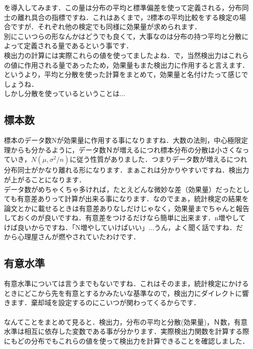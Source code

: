 \documentclass[11pt,a4paper]{ujreport} 	%
\begin{document}
を導入してみます．この量は分布の平均と標準偏差を使って定義される，分布同士の離れ具合の指標ですね．これはあくまで，2標本の平均比較をする検定の場合ですが．それぞれ他の検定でも同様に効果量が求められます．\\

別にこいつらの形なんかはどうでも良くて，大事なのは分布の持つ平均と分散によって定義される量であるという事です．\\

検出力の計算には実際これらの値を使ってましたよね．で，当然検出力はこれらの値に作用される量であったため，効果量もまた検出力に作用すると言えます．というより，平均と分散を使った計算をまとめて，効果量と名付けたって感じでしょうね．\\

しかし分散を使っているということは...

\subsection{標本数}
標本のデータ数Nが効果量に作用する事になりますね．大数の法則，中心極限定理からも分かるように，データ数Ｎが増えるにつれ標本分布の分散は小さくなっていき，$N(\mu, {\sigma}^2/n)$に従う性質がありました．つまりデータ数が増えるにつれ分布同士がかなり離れる形になります．まぁこれは分かりやすいですね．検出力が上がることになります．\\

データ数がめちゃくちゃ多ければ，たとえどんな微妙な差（効果量）だったとしても有意差ありって計算が出来る事になります．なのでまぁ，統計検定の結果を論文とかに載せるときは有意差ありなしだけじゃなく，効果量までちゃんと報告しておくのが良いですね．有意差をつけるだけなら簡単に出来ます．n増やしてけば良いからですね．「N増やしていけばいい」...うん，よく聞く話ですね．だから心理屋さんが燃やされていたわけです．\\

\subsection{有意水準}
有意水準については言うまでもないですね．これはそのまま，統計検定にかけるときにどこから先を有意とするかみたいな基準なので，検出力にダイレクトに響きます．棄却域を設定するのにこいつが関わってくるからです．\\\\

なんてことをまとめて見ると．検出力，分布の平均と分散(効果量)，Ｎ数，有意水準は相互に依存した変数である事が分かります．実際検出力関数を計算する際にもどの分布でもこれらの値を使って検出力を計算できることを確認しました．\\
\end{document}
